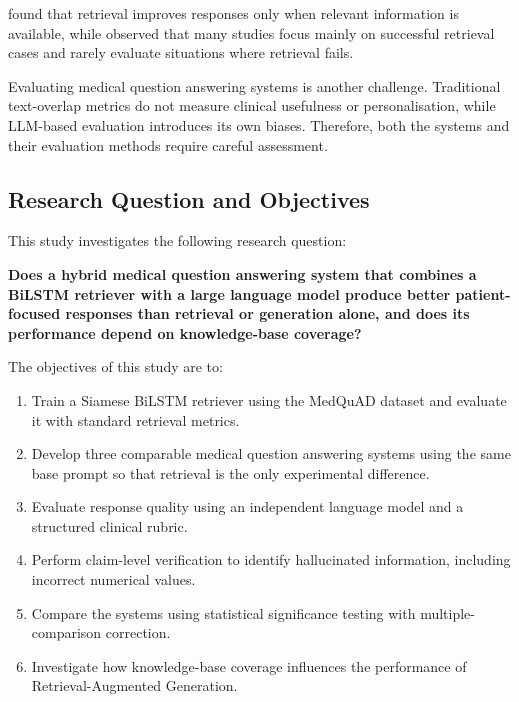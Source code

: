 \citet{xiong2024} found that retrieval improves responses only when relevant information is available, while \citet{gao2024} observed that many studies focus mainly on successful retrieval cases and rarely evaluate situations where retrieval fails.

Evaluating medical question answering systems is another challenge. Traditional text-overlap metrics do not measure clinical usefulness or personalisation, while LLM-based evaluation introduces its own biases. Therefore, both the systems and their evaluation methods require careful assessment.

\subsection{Research Question and Objectives}

This study investigates the following research question:

\textbf{Does a hybrid medical question answering system that combines a BiLSTM retriever with a large language model produce better patient-focused responses than retrieval or generation alone, and does its performance depend on knowledge-base coverage?}

The objectives of this study are to:

\begin{enumerate}

\item Train a Siamese BiLSTM retriever using the MedQuAD dataset and evaluate it with standard retrieval metrics.

\item Develop three comparable medical question answering systems using the same base prompt so that retrieval is the only experimental difference.

\item Evaluate response quality using an independent language model and a structured clinical rubric.

\item Perform claim-level verification to identify hallucinated information, including incorrect numerical values.

\item Compare the systems using statistical significance testing with multiple-comparison correction.

\item Investigate how knowledge-base coverage influences the performance of Retrieval-Augmented Generation.

\end{enumerate}

